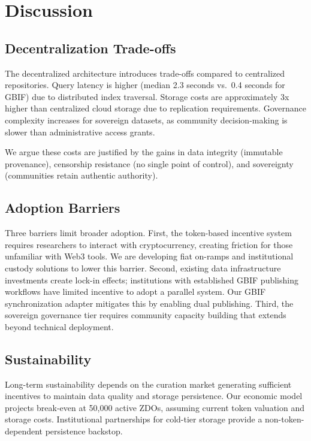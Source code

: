\section{Discussion}

\label{sec:discussion}

\subsection{Decentralization Trade-offs}

The decentralized architecture introduces trade-offs compared to centralized repositories.
Query latency is higher (median 2.3 seconds vs.\ 0.4 seconds for GBIF) due to distributed index traversal.
Storage costs are approximately 3x higher than centralized cloud storage due to replication requirements.
Governance complexity increases for sovereign datasets, as community decision-making is slower than administrative access grants.

We argue these costs are justified by the gains in data integrity (immutable provenance), censorship resistance (no single point of control), and sovereignty (communities retain authentic authority).

\subsection{Adoption Barriers}

Three barriers limit broader adoption.
First, the token-based incentive system requires researchers to interact with cryptocurrency, creating friction for those unfamiliar with Web3 tools.
We are developing fiat on-ramps and institutional custody solutions to lower this barrier.
Second, existing data infrastructure investments create lock-in effects; institutions with established GBIF publishing workflows have limited incentive to adopt a parallel system.
Our GBIF synchronization adapter mitigates this by enabling dual publishing.
Third, the sovereign governance tier requires community capacity building that extends beyond technical deployment.

\subsection{Sustainability}

Long-term sustainability depends on the curation market generating sufficient incentives to maintain data quality and storage persistence.
Our economic model projects break-even at 50,000 active ZDOs, assuming current token valuation and storage costs.
Institutional partnerships for cold-tier storage provide a non-token-dependent persistence backstop.

